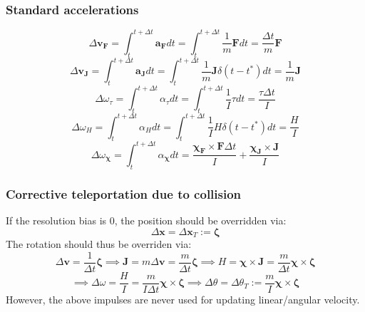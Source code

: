\documentclass[10pt]{report}
\begin{document}
\subsubsection{Standard accelerations}
\begin{equation}\Delta\boldsymbol{v}_{\boldsymbol{F}}=\int_t^{t+\Delta t}\boldsymbol{a}_{\boldsymbol{F}}dt=\int_t^{t+\Delta t}\frac{1}{m}\boldsymbol{F}dt=\frac{\Delta t}{m}\boldsymbol{F}\end{equation}
\begin{equation}\Delta\boldsymbol{v}_{\boldsymbol{J}}=\int_t^{t+\Delta t}\boldsymbol{a}_{\boldsymbol{J}}dt=\int_t^{t+\Delta t}\frac{1}{m}\boldsymbol{J}\delta(t-t^*)dt=\frac{1}{m}\boldsymbol{J}\end{equation}
\begin{equation}\Delta\omega_\tau=\int_t^{t+\Delta t}\alpha_\tau dt=\int_t^{t+\Delta t}\frac{1}{I}\tau dt=\frac{\tau\Delta t}{I}\end{equation}
\begin{equation}\Delta\omega_H=\int_t^{t+\Delta t}\alpha_Hdt=\int_t^{t+\Delta t}\frac{1}{I}H\delta(t-t^*)dt=\frac{H}{I}\end{equation}
\begin{equation}\Delta\omega_{\boldsymbol{\chi}}=\int_t^{t+\Delta t}\alpha_{\boldsymbol{\chi}}dt=\frac{\boldsymbol{\chi_{\boldsymbol{F}}}\times{\boldsymbol{F}}\Delta t}{I}+\frac{\boldsymbol{\chi_{\boldsymbol{J}}}\times{\boldsymbol{J}}}{I}\end{equation}

\subsubsection{Corrective teleportation due to collision}
If the resolution bias is 0, the position should be overridden via:
\begin{equation}\Delta\boldsymbol{x}=\Delta\boldsymbol{x}_T:=\boldsymbol{\zeta}\end{equation}
 The rotation should thus be overriden via:
\begin{equation}\Delta\boldsymbol{v}=\frac{1}{\Delta t}\boldsymbol{\zeta}\implies \boldsymbol{J}=m\Delta\boldsymbol{v}=\frac{m}{\Delta t}\boldsymbol{\zeta}\implies H=\boldsymbol{\chi}\times\boldsymbol{J}=\frac{m}{\Delta t}\boldsymbol{\chi}\times\boldsymbol{\zeta}\end{equation}
\begin{equation}\implies\Delta\omega=\frac{H}{I}=\frac{m}{I\Delta t}\boldsymbol{\chi}\times\boldsymbol{\zeta}\implies\Delta\theta=\Delta\theta_T:=\frac{m}{I}\boldsymbol{\chi}\times\boldsymbol{\zeta}\end{equation}
However, the above impulses are never used for updating linear/angular velocity.
\end{document}
